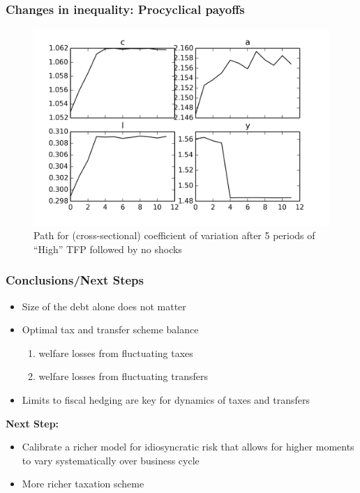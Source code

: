 \documentclass{beamer}
\begin{document}
 
 
 
 
 
\begin{frame}
 \frametitle{Changes in inequality: Procyclical payoffs}

\begin{figure}[htp]
\includegraphics[width=\textwidth]{coeff_variation_procyclic_payoffs.png}
\caption{\tiny{Path for (cross-sectional) coefficient of variation after 5 periods of ``High'' TFP followed by no shocks}}
\label{fig:}
\end{figure}
 \end{frame}

 
 
 
 
 
 \begin{frame}
  \frametitle{Conclusions/Next Steps}
 
 
 \begin{itemize}
  \item Size of the debt alone does not matter
\item Optimal tax and transfer scheme balance
\begin{enumerate}
 \item welfare losses from fluctuating taxes
 \item welfare losses from fluctuating transfers
\end{enumerate}
\item Limits to fiscal hedging are key for dynamics of taxes and transfers

 \end{itemize}

 
 \textbf{Next Step:}
 \begin{itemize}
 \item Calibrate a richer model for idiosyncratic risk that allows for higher moments to vary systematically over business cycle
 \item More richer taxation scheme
 \end{itemize}
 
 
  

 \end{frame}
 
\end{document}
